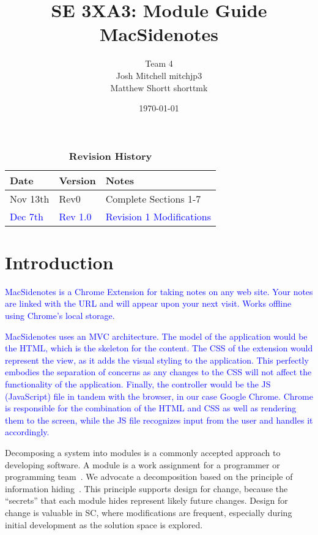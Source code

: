 \documentclass[12pt, titlepage]{article}
\title{SE 3XA3: Module Guide\\MacSidenotes}
\author{Team 4
	\\ Josh Mitchell mitchjp3
	\\ Matthew Shortt shorttmk
}
\date{\today}
\begin{document}
\maketitle

\tableofcontents
\listoftables
\listoffigures

\begin{table}[H]
\caption{\bf Revision History}
\begin{tabularx}{\textwidth}{p{3cm}p{2cm}X}
\toprule {\bf Date} & {\bf Version} & {\bf Notes}\\
\midrule
Nov 13th & Rev0 & Complete Sections 1-7\\
\textcolor{blue}{Dec 7th} & \textcolor{blue}{Rev 1.0} & \textcolor{blue}{Revision 1 
Modifications}\\
\bottomrule
\end{tabularx}
\end{table}

\newpage


\section{Introduction}

\textcolor{blue}{MacSidenotes is a Chrome Extension for taking notes on any web site. 
Your notes are linked with the URL and will appear upon your next visit. Works offline 
using Chrome's local storage.}

\textcolor{blue}{MacSidenotes uses an MVC architecture. The model of the application 
would be the HTML, which is the skeleton for the content. The CSS of the extension 
would represent the view, as it adds the visual styling to the application. This perfectly 
embodies the separation of concerns as any changes to the CSS will not affect the 
functionality of the application. Finally, the controller would be the JS (JavaScript) file in 
tandem with the browser, in our case Google Chrome. Chrome is responsible for the 
combination of the HTML and CSS as well as rendering them to the screen, while the JS 
file recognizes input from the user and handles it accordingly.}

Decomposing a system into modules is a commonly accepted approach to developing
software.  A module is a work assignment for a programmer or programming
team~\citep{ParnasEtAl1984}.  We advocate a decomposition
based on the principle of information hiding~\citep{Parnas1972a}.  This
principle supports design for change, because the ``secrets'' that each module
hides represent likely future changes.  Design for change is valuable in SC,
where modifications are frequent, especially during initial development as the
solution space is explored.  
\end{document}

